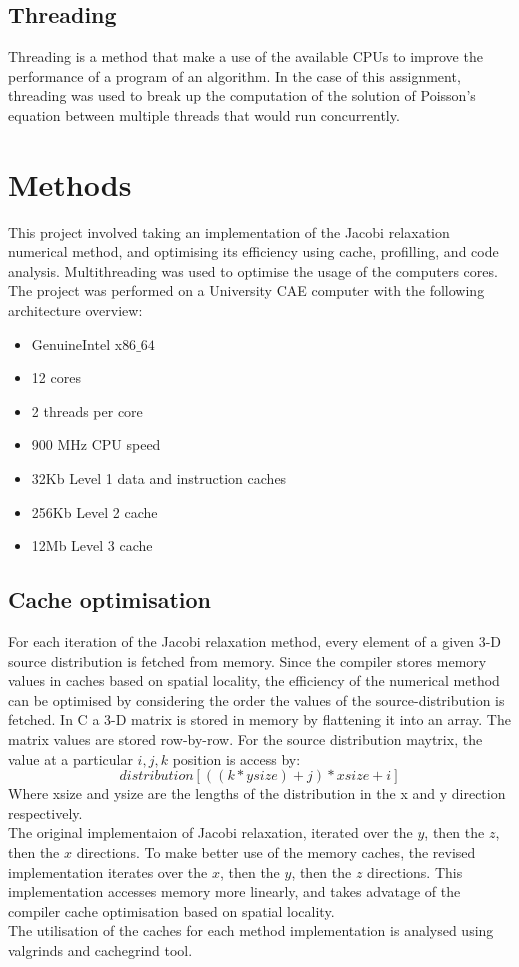 \documentclass[a4paper, 12pt]{article}
\begin{document}
\subsection{Threading}
Threading is a method that make a use of the available CPUs to improve the performance of a program of an algorithm. In the case of this assignment, threading was used to break up the computation of the solution of Poisson's equation between multiple threads that would run concurrently.

\section{Methods}
	This project involved taking an implementation of the Jacobi relaxation numerical method, and optimising its efficiency using cache, profilling, and code analysis. Multithreading was used to optimise the usage of the computers cores. 
	\\
	The project was performed on a University CAE computer with the following architecture overview:
	\begin{itemize}
		\item GenuineIntel x$86\_64$
		\item 12 cores
		\item 2 threads per core
		\item 900 MHz CPU speed
		\item 32Kb Level 1 data and instruction caches
		\item 256Kb Level 2 cache
		\item 12Mb Level 3 cache
	\end{itemize}
	

\subsection{Cache optimisation}
For each iteration of the Jacobi relaxation method, every element of a given 3-D source distribution is fetched from memory. Since the compiler stores memory values in caches based on spatial locality, the efficiency of the numerical method can be optimised by considering the order the values of the source-distribution is fetched. In C a 3-D matrix is stored in memory by flattening it into an array. The matrix values are stored row-by-row. For the source distribution maytrix, the value at a particular $i, j, k$ position is access by:
%
\begin{equation}
distribution[((k*ysize) + j)*xsize + i]
\end{equation}
%
Where xsize and ysize are the lengths of the distribution in the x and y direction respectively.
\\
The original implementaion of Jacobi relaxation, iterated over the $y$, then the $z$, then the $x$ directions. To make better use of the memory caches, the revised implementation iterates over the $x$, then the $y$, then the $z$ directions. This implementation accesses memory more linearly, and takes advatage of the compiler cache optimisation based on spatial locality. 
\\
The utilisation of the caches for each method implementation is analysed using valgrinds and cachegrind tool. 
\end{document}
